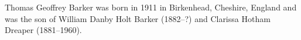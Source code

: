 
Thomas Geoffrey Barker was born in 1911 in Birkenhead, Cheshire, England
and was the son of William Danby Holt Barker (1882--?) and Clarissa Hotham Dreaper (1881--1960).	


